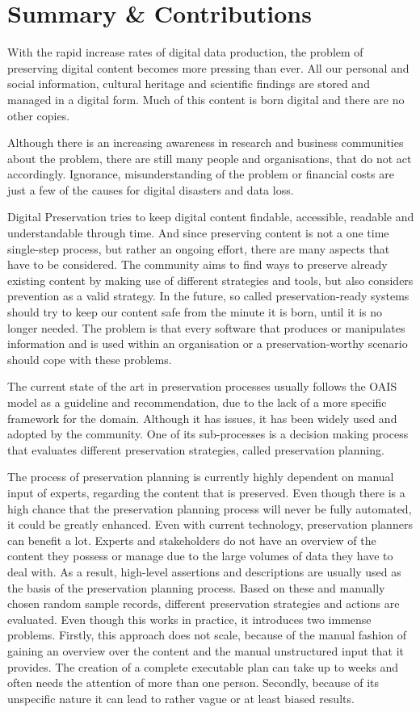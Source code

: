 \section{Summary \& Contributions}
With the rapid increase rates of digital data production, the problem of preserving digital content becomes more pressing than ever.
All our personal and social information, cultural heritage and scientific findings are stored and managed in a digital form.
Much of this content is born digital and there are no other copies.

Although there is an increasing awareness in research and business communities about the problem, there are still many people and organisations, that do not act accordingly.
Ignorance, misunderstanding of the problem or financial costs are just a few of the causes for digital disasters and data loss.

Digital Preservation tries to keep digital content findable, accessible, readable and understandable through time.
And since preserving content is not a one time single-step process, but rather an ongoing effort, there are many aspects that have to be considered.
The community aims to find ways to preserve already existing content by making use of different strategies and tools, but also considers prevention as a valid strategy.
In the future, so called preservation-ready systems should try to keep our content safe from the minute it is born, until it is no longer needed. The problem is that every software that produces or manipulates information and is used within an organisation or a preservation-worthy scenario should cope with these problems.

The current state of the art in preservation processes usually follows the OAIS model as a guideline and recommendation, due to the lack of a more specific framework for the domain.
Although it has issues, it has been widely used and adopted by the community.
One of its sub-processes is a decision making process that evaluates different preservation strategies, called preservation planning.

The process of preservation planning is currently highly dependent on manual input of experts, regarding the content that is preserved.
Even though there is a high chance that the preservation planning process will never be fully automated, it could be greatly enhanced. Even with current technology, preservation planners can benefit a lot.
Experts and stakeholders do not have an overview of the content they possess or manage due to the large volumes of data they have to deal with.
As a result, high-level assertions and descriptions are usually used as the basis of the preservation planning process.
Based on these and manually chosen random sample records, different preservation strategies and actions are evaluated.
Even though this works in practice, it introduces two immense problems.
Firstly, this approach does not scale, because of the manual fashion of gaining an overview over the content and the manual unstructured input that it provides.
The creation of a complete executable plan can take up to weeks and often needs the attention of more than one person.
Secondly, because of its unspecific nature it can lead to rather vague or at least biased results.

